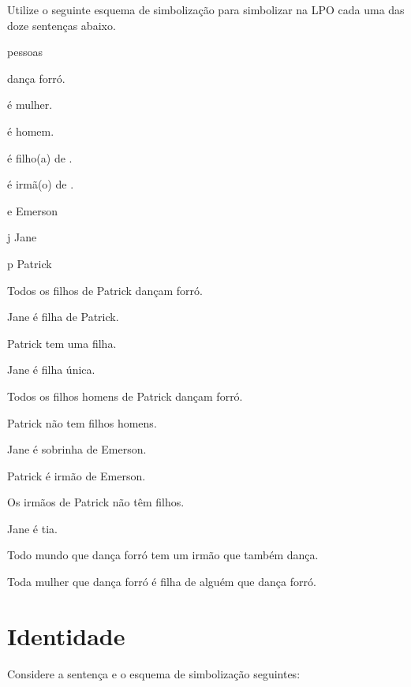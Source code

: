 \solutions
\problempart
\label{pr.FOLballet}
Utilize o seguinte esquema de simbolização para simbolizar na LPO cada uma das doze sentenças abaixo.
\begin{center}
\begin{ekey}
\item[\text{domínio}] pessoas
\item[\atom{D}{x}]  dança forró.
\item[\atom{M}{x}]  é mulher.
\item[\atom{H}{x}]  é homem.
\item[\atom{F}{x,y}]  é filho(a) de .
\item[\atom{I}{x,y}]  é irmã(o) de .
\item[e] Emerson
\item[j] Jane
\item[p] Patrick
\end{ekey}
\end{center}
\begin{earg}
\item Todos os filhos de Patrick dançam forró.
\item Jane é filha de Patrick.
\item Patrick tem uma filha.
\item Jane é filha única.
\item Todos os filhos homens de Patrick dançam forró.
\item Patrick não tem filhos homens.
\item Jane é sobrinha de Emerson.
\item Patrick é irmão de Emerson.
\item Os irmãos de Patrick não têm filhos.
\item Jane é tia.
\item Todo mundo que dança forró tem um irmão que também dança.
\item Toda mulher que dança forró é filha de alguém que dança forró.
\end{earg}


\chapter{Identidade}
\label{sec.identity}

Considere a sentença e o esquema de simbolização seguintes: 

